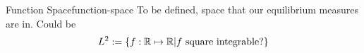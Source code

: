\begin{definition}{Function Space}{function-space}
  To be defined, space that our equilibrium measures are in. Could be
  \[L^2 := \{f: \mathbb{R} \mapsto \mathbb{R} | f ~\text{square integrable?}\}\]
  \hierKoennteIhreWerbungStehen
\end{definition}
